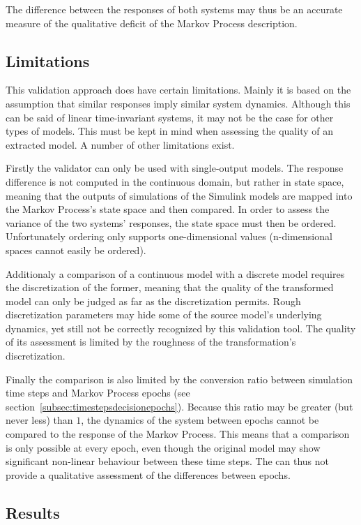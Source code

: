 The difference between the responses of both systems may thus be an accurate measure of the qualitative deficit of the Markov Process description.

\subsection{Limitations}

This validation approach does have certain limitations. Mainly it is based on the assumption that similar responses imply similar system dynamics. Although this can be said of linear time-invariant systems, it may not be the case for other types of models. This must be kept in mind when assessing the quality of an extracted model. A number of other limitations exist.

Firstly the validator can only be used with single-output models. The response difference is not computed in the continuous domain, but rather in state space, meaning that the outputs of simulations of the Simulink models are mapped into the Markov Process's state space and then compared. In order to assess the variance of the two systems' responses, the state space must then be ordered. Unfortunately ordering only supports one-dimensional values (n-dimensional spaces cannot easily be ordered).

Additionaly a comparison of a continuous model with a discrete model requires the discretization of the former, meaning that the quality of the transformed model can only be judged as far as the discretization permits. Rough discretization parameters may hide some of the source model's underlying dynamics, yet still not be correctly recognized by this validation tool. The quality of its assessment is limited by the roughness of the transformation's discretization.

Finally the comparison is also limited by the conversion ratio between simulation time steps and Markov Process epochs (see section~\ref{subsec:timestepsdecisionepochs}). Because this ratio may be greater (but never less) than $1$, the dynamics of the system between epochs cannot be compared to the response of the Markov Process. This means that a comparison is only possible at every epoch, even though the original model may show significant non-linear behaviour between these time steps. The  can thus not provide a qualitative assessment of the differences between epochs.

\subsection{Results}
\label{subsec:validatorresults}


